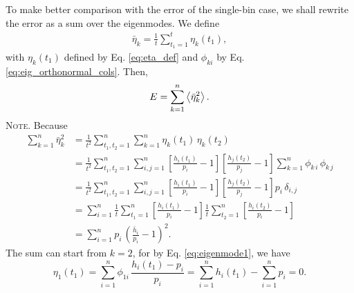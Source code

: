 \documentclass[reprint, floatfix]{revtex4-1}
\newcommand{\note}[1]{{\color{DarkGreen}\footnotesize \textsc{Note.} #1}}
\begin{document}
To make better comparison with
the error of the single-bin case,
we shall rewrite the error as
a sum over the eigenmodes.
We define
\begin{align}
\bar \eta_k
=
\frac{ 1 } { t }
\sum_{ t_1 = 1 } ^ t
  \eta_k( t_1 ),
\end{align}
%
with $\eta_k(t_1)$ defined by Eq. \eqref{eq:eta_def}
and $\phi_{k i}$ by Eq. \eqref{eq:eig_orthonormal_cols}.
%
Then,
%
\begin{align}
E
=
\sum_{ k = 1 }^n
  \left\langle
    \bar \eta_k^2
  \right\rangle.
  \notag
\label{eq:error_sbin_equil}
\end{align}
%
\note{Because
%
\begin{align*}
\sum_{ k = 1 }^n
  \bar \eta_k^2
&=
\frac{ 1 } { t^2 }
\sum_{ t_1, t_2 = 1 }^n
  \sum_{ k = 1 }^n
    \eta_k( t_1 ) \, \eta_k( t_2 )
\\
&=
\frac{ 1 } { t^2 }
\sum_{ t_1, t_2 = 1 }^n
  \sum_{ i, j = 1 }^n
    \left[
      \frac{ h_i(t_1) }
           { p_i      }
      - 1
    \right]
    \left[
      \frac{ h_j(t_2) }
           { p_j      }
      - 1
    \right]
    \sum_{ k = 1 }^n
      \phi_{k \, i} \, \phi_{k \, j}
\\
&=
\frac{ 1 } { t^2 }
\sum_{ t_1, t_2 = 1 }^n
  \sum_{ i, j = 1 }^n
    \left[
      \frac{ h_i(t_1) }
           { p_i      }
      - 1
    \right]
    \left[
      \frac{ h_j(t_2) }
           { p_j      }
      - 1
    \right]
    p_i \, \delta_{i, j}
\\
&=
\sum_{ i = 1 }^n
\frac{ 1 } { t }
\sum_{ t_1 = 1 }^n
    \left[
      \frac{ h_i(t_1) }
           { p_i      }
      - 1
    \right]
\frac{ 1 } { t }
\sum_{ t_2 = 1 }^n
    \left[
      \frac{ h_i(t_2) }
           { p_i      }
      - 1
    \right]
\\
&=
\sum_{ i = 1 }^n
  p_i \,
    \left(
      \frac{ \bar h_i }
           { p_i      }
      - 1
    \right)^2
.
\end{align*}
}
The sum can start from $k = 2$, for
by Eq. \eqref{eq:eigenmode1}, we have
$$
\eta_1(t_1)
=
\sum_{ i = 1 }^n
  \phi_{1i} \, \frac{ h_i(t_1) - p_i } { p_i }
=
\sum_{ i = 1 }^n h_i(t_1)
- \sum_{ i = 1 }^n p_i = 0.
$$
\end{document}
